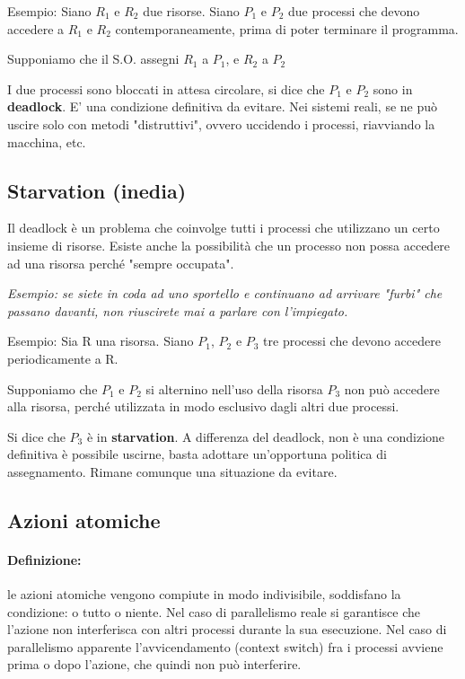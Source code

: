 Esempio:
Siano $R_1$ e $R_2$ due risorse.
Siano $P_1$ e $P_2$ due processi che devono accedere a $R_1$ e $R_2$ contemporaneamente, prima di poter terminare il programma.

Supponiamo che il S.O. assegni $R_1$ a $P_1$, e $R_2$ a $P_2$
\newline

I due processi sono bloccati in attesa circolare, si dice che $P_1$ e $P_2$ sono in \textbf{deadlock}.
E' una condizione definitiva da evitare.
Nei sistemi reali, se ne può uscire solo con metodi "distruttivi", ovvero uccidendo i processi, riavviando la macchina, etc.

\subsection{Starvation (inedia)}
Il deadlock è un problema che coinvolge tutti i processi che utilizzano un certo insieme di risorse. Esiste anche la possibilità che un processo non possa accedere ad una risorsa perché "sempre occupata".

\textit{Esempio: se siete in coda ad uno sportello e continuano ad arrivare "furbi" che passano davanti, non riuscirete mai a parlare con l'impiegato.}
\newline

Esempio:
Sia R una risorsa.
Siano $P_1$, $P_2$ e $P_3$ tre processi che devono accedere periodicamente a R.
\newline

Supponiamo che $P_1$ e $P _2$ si alternino nell'uso della risorsa
$P_3$ non può accedere alla risorsa, perché utilizzata in modo esclusivo dagli altri due processi.

Si dice che $P_3$ è in \textbf{starvation}.
A differenza del deadlock, non è una condizione definitiva è possibile uscirne, basta adottare un'opportuna politica di assegnamento.
Rimane comunque una situazione da evitare.

\subsection{Azioni atomiche}
\paragraph{Definizione:} le azioni atomiche vengono compiute in modo indivisibile, soddisfano la condizione: o tutto o niente.
Nel caso di parallelismo reale si garantisce che l'azione non interferisca con altri processi durante la sua esecuzione.
Nel caso di parallelismo apparente l'avvicendamento (context switch) fra i processi avviene prima o dopo l'azione, che quindi non può interferire.
\newline

